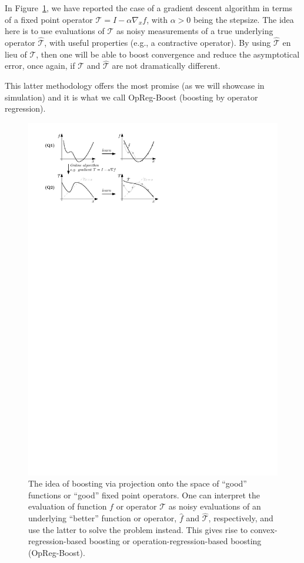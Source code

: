 \documentclass{article}
\begin{document}
In Figure~\ref{fig.1}, we have reported the case of a gradient descent algorithm in terms of a fixed point operator $\mathcal{T} = I - \alpha \nabla_{x}f$, with $\alpha>0$ being the stepsize. The idea here is to use evaluations of $\mathcal{T}$ as noisy measurements of a true underlying operator $\hat{\mathcal{T}}$, with useful properties (e.g., a contractive operator). By using $\hat{\mathcal{T}}$ en lieu of $\mathcal{T}$, then one will be able to boost convergence and reduce the asymptotical error, once again, if $\mathcal{T}$ and $\hat{\mathcal{T}}$ are not dramatically different. 

This latter methodology offers the most promise (as we will showcase in simulation) and it is what we call OpReg-Boost (boosting by operator regression). 


\begin{figure}
\centering
\includegraphics[width=.925\columnwidth]{Figures/explanation}
\caption{The idea of boosting via projection onto the space of ``good'' functions or ``good'' fixed point operators. One can interpret the evaluation of function $f$ or operator $\mathcal{T}$ as noisy evaluations of an underlying ``better'' function or operator, $\hat{f}$ and $\hat{\mathcal{T}}$, respectively, and use the latter to solve the problem instead. This gives rise to convex-regression-based boosting or operation-regression-based boosting (OpReg-Boost).}
\label{fig.1}
\end{figure}
\end{document}
